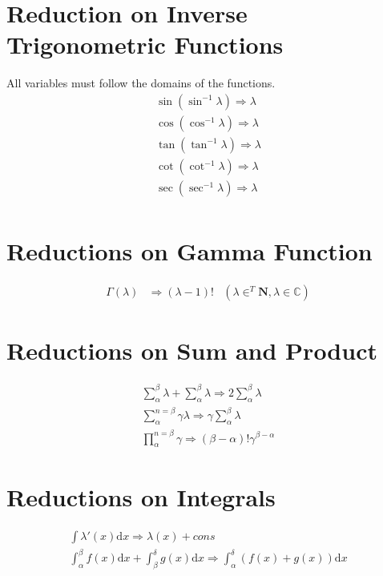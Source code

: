 \documentclass[11pt,a4paper]{book}
\begin{document}
\section{Reduction on Inverse Trigonometric Functions}
All variables must follow the domains of the functions.
\begin{eqnarray}
\sin(\sin^{-1}\lambda) \Rightarrow \lambda \\
\cos(\cos^{-1}\lambda) \Rightarrow \lambda \\
\tan(\tan^{-1}\lambda) \Rightarrow \lambda \\
\cot(\cot^{-1}\lambda) \Rightarrow \lambda \\
\sec(\sec^{-1}\lambda) \Rightarrow \lambda \\
\end{eqnarray}


\section{Reductions on Gamma Function}

\begin{align}
\Gamma(\lambda) &\Rightarrow (\lambda - 1)! & \left(\lambda \in^T \mathbf{N}, \lambda \in \mathbb{C} \right)
\end{align}

\section{Reductions on Sum and Product}

\begin{eqnarray}
\sum_{\alpha}^{\beta} \lambda + \sum_{\alpha}^{\beta} \lambda \Rightarrow 2 \sum_{\alpha}^{\beta} \lambda \\
\sum_{\alpha}^{n = \beta} \gamma \lambda \Rightarrow \gamma \sum_{\alpha}^{\beta} \lambda \\
\prod_{\alpha}^{n = \beta} \gamma \Rightarrow \left( \beta - \alpha \right)! \gamma^{\beta - \alpha}
\end{eqnarray}

\section{Reductions on Integrals}

\begin{eqnarray}
\int \lambda'(x) \text{d}x \Rightarrow \lambda(x) + cons \\
\int_{\alpha}^{\beta} f(x) \text{d}x + \int_{\beta}^{\delta} g(x) \text{d}x \Rightarrow \int_{\alpha}^{\delta} \left( f(x) + g(x) \right) \text{d}x  
\end{eqnarray}
\end{document}
